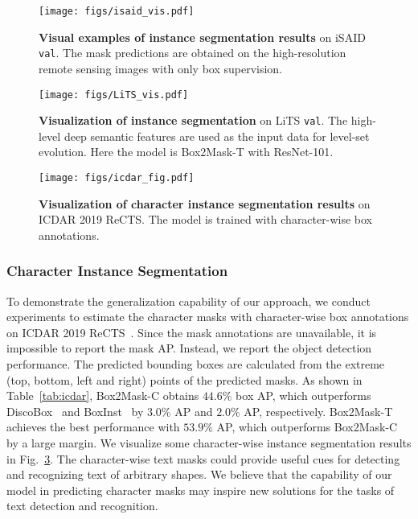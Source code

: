 \documentclass[12pt,onecolumn,letterpaper]{article}
\begin{document}
\begin{figure}[htbp]
\centering      
\texttt{[image: figs/isaid\_vis.pdf]}
\caption{\textbf{Visual examples of instance segmentation results} on iSAID \texttt{val}. The mask predictions are obtained on the high-resolution remote sensing images with only box supervision.}   
\label{fig:remote_sensing}   
\end{figure}

\begin{figure}[t]
\centering
\texttt{[image: figs/LiTS\_vis.pdf]}
\caption{\textbf{Visualization of instance segmentation} on LiTS \texttt{val}. The high-level deep semantic features are used as the input data for level-set evolution. Here the model is Box2Mask-T with ResNet-101.} \label{fig:lits_vis_1}
\end{figure}


\begin{figure}[t]
	\centering   
	\texttt{[image: figs/icdar\_fig.pdf]}
	\caption{\textbf{Visualization of character instance segmentation results} on ICDAR 2019 ReCTS. The model is trained with character-wise box annotations.}   
	\label{fig:icdar}   
\end{figure}

\subsubsection{Character Instance Segmentation}

To demonstrate the generalization capability of our approach, we conduct experiments to estimate the character masks with character-wise box annotations on ICDAR 2019 ReCTS~\cite{zhang2019icdar}. 
Since the mask annotations are unavailable, it is impossible to report the mask AP. Instead, we report the object detection performance. The predicted bounding boxes are calculated from the extreme (top, bottom, left and right) points of the predicted masks.
As shown in Table~\ref{tab:icdar},  Box2Mask-C obtains $44.6\%$ box AP, which outperforms DiscoBox~\cite{iccv2021discobox} and BoxInst~\cite{cvpr2021_boxinst} by $3.0\%$ AP and $2.0\%$ AP, respectively. Box2Mask-T achieves the best performance with $53.9\%$ AP, which outperforms Box2Mask-C by a large margin. 
We visualize some character-wise instance segmentation results in Fig.~\ref{fig:icdar}.
The character-wise text masks could provide useful cues for detecting and recognizing text of arbitrary shapes. We believe that the capability of our model in predicting character masks may inspire new solutions for the tasks of text detection and recognition.
\end{document}
